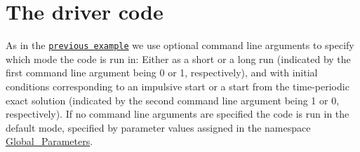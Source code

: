  

\hypertarget{index_main}{}\section{The driver code}\label{index_main}
As in the \href{../../rayleigh_channel/html/index.html}{\tt previous example} we use optional command line arguments to specify which mode the code is run in\+: Either as a short or a long run (indicated by the first command line argument being 0 or 1, respectively), and with initial conditions corresponding to an impulsive start or a start from the time-\/periodic exact solution (indicated by the second command line argument being 1 or 0, respectively). If no command line arguments are specified the code is run in the default mode, specified by parameter values assigned in the namespace {\ttfamily \hyperlink{namespaceGlobal__Parameters}{Global\+\_\+\+Parameters}}.


